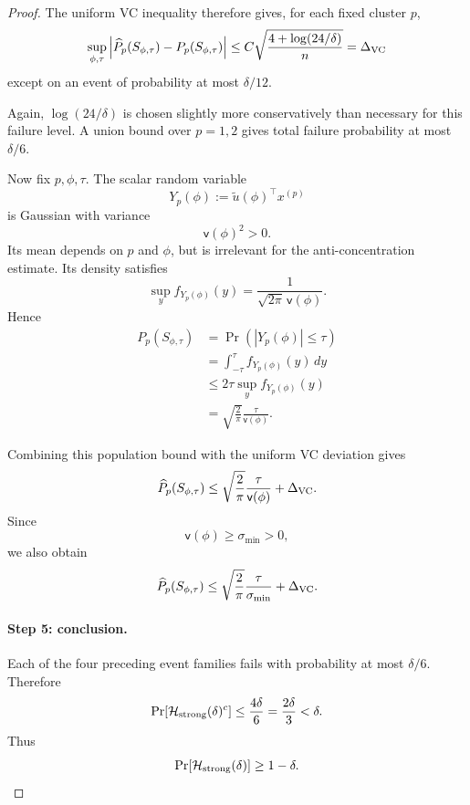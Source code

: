 \documentclass{article} %
\theoremstyle{plain}
\theoremstyle{definition}
\theoremstyle{remark}
\begin{document}
\begin{proof}
The uniform VC inequality therefore gives, for each fixed cluster $p$,
\[
\sup_{\phi,\tau}
\left|
\widehat P_p(S_{\phi,\tau})
-
P_p(S_{\phi,\tau})
\right|
\le
C
\sqrt{
\frac{
4+\log(24/\delta)
}{n}
}
=
\Delta_{\rm VC}
\]
except on an event of probability at most $\delta/12$.

Again, $\log(24/\delta)$ is chosen slightly more conservatively than
necessary for this failure level. A union bound over $p=1,2$ gives
total failure probability at most $\delta/6$.

Now fix $p,\phi,\tau$. The scalar random variable
\[
Y_p(\phi)
:=
\widetilde u(\phi)^\top x^{(p)}
\]
is Gaussian with variance
\[
\mathsf v(\phi)^2>0.
\]
Its mean depends on $p$ and $\phi$, but is irrelevant for the
anti-concentration estimate. Its density satisfies
\[
\sup_y f_{Y_p(\phi)}(y)
=
\frac{1}{
\sqrt{2\pi}\,\mathsf v(\phi)
}.
\]
Hence
\begin{align*}
P_p(S_{\phi,\tau})
&=
\Pr\!\left(
|Y_p(\phi)|\le\tau
\right)
\\
&=
\int_{-\tau}^{\tau}
f_{Y_p(\phi)}(y)\,dy
\\
&\le
2\tau
\sup_y f_{Y_p(\phi)}(y)
\\
&=
\sqrt{\frac2\pi}
\frac{\tau}{\mathsf v(\phi)}.
\end{align*}

Combining this population bound with the uniform VC deviation gives
\[
\widehat P_p(S_{\phi,\tau})
\le
\sqrt{\frac2\pi}
\frac{\tau}{\mathsf v(\phi)}
+
\Delta_{\rm VC}.
\]
Since
\[
\mathsf v(\phi)\ge\sigma_{\min}>0,
\]
we also obtain
\[
\widehat P_p(S_{\phi,\tau})
\le
\sqrt{\frac2\pi}
\frac{\tau}{\sigma_{\min}}
+
\Delta_{\rm VC}.
\]

\paragraph{Step 5: conclusion.}

Each of the four preceding event families fails with probability at most
$\delta/6$. Therefore
\[
\Pr\!\left[
\mathcal H_{\rm strong}(\delta)^c
\right]
\le
\frac{4\delta}{6}
=
\frac{2\delta}{3}
<
\delta.
\]
Thus
\[
\Pr\!\left[
\mathcal H_{\rm strong}(\delta)
\right]
\ge
1-\delta.
\]
\end{proof}
\end{document}
